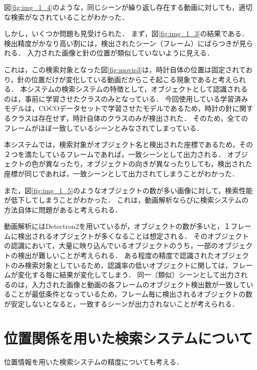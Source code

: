 \documentclass[a4j,12pt,dvipdfmx]{jreport}
\begin{document}
図\ref{fig:img_1_4}のような，同じシーンが繰り返し存在する動画に対しても，適切な検索がなされていることがわかった．

しかし，いくつか問題も見受けられた．
まず，図\ref{fig:img_1_3}の結果である．
検出精度がかなり高い割には，検出されたシーン（フレーム）にばらつきが見られる．
入力された画像と針の位置が類似していないように見える．

これは，この検索対象となった図\ref{fig:movie3}は，時計自体の位置は固定されており，針の位置だけが変化している動画だからこそ起こる現象であると考えられる．
本システムの検索システムの特徴として，オブジェクトとして認識されるのは，事前に学習させたクラスのみとなっている．
今回使用している学習済みモデルは，COCOデータセットで学習させたモデルであるため，時計の針に関するクラスは存在せず，時計自体のクラスのみが検出された．
そのため，全てのフレームがほぼ一致しているシーンとみなされてしまっている．

本システムでは，検索対象がオブジェクト名と検出された座標であるため，その２つを満たしているフレームであれば，一致シーンとして出力される．
オブジェクトの色が異なったり，オブジェクトの向きが異なったりしても，検出された座標が同じであれば，一致シーンとして出力されてしまうことがわかった．

また，図\ref{fig:img_1_5}のようなオブジェクトの数が多い画像に対して，検索性能が低下してしまうことがわかった．
これは，動画解析ならびに検索システムの方法自体に問題があると考えられる．

動画解析にはDetectron2を用いているが，オブジェクトの数が多いと，１フレームに検出されるオブジェクトが多くなることは想定される．
そのオブジェクトの認識において，大量に映り込んでいるオブジェクトのうち，一部のオブジェクトの検出が難しいことが考えられる．
ある程度の精度で認識されたオブジェクトのみ検索対象としているため，認識率の低いオブジェクトに関しては，フレームが変化する毎に結果が変化してしまう．
同一（類似）シーンとして出力されるのは，入力された画像と動画の各フレームのオブジェクト検出数が一致していることが最低条件となっているため，フレーム毎に検出されるオブジェクトの数が安定しないとなると，一致するシーンが出力されないことが考えられる．

\section{位置関係を用いた検索システムについて}\label{chap4-3}
位置情報を用いた検索システムの精度についても考える．
\end{document}
